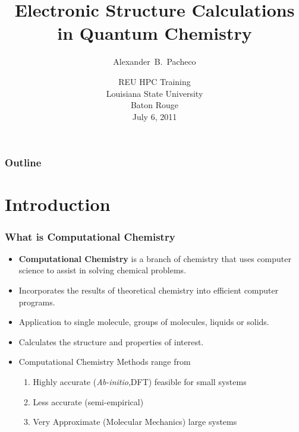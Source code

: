 \documentclass[slidestop,mathserif,compress,xcolor=svgnames]{beamer}
\title[Comp. Chem.]{Electronic Structure Calculations in Quantum Chemistry}
\author[Alex Pacheco]{\large{Alexander~B.~Pacheco}}
\institute[High Performance Computing @ Louisiana State University - http://www.hpc.lsu.edu] {\inst{}\footnotesize{User Services Consultant\\LSU HPC \& LONI\\sys-help@loni.org}}
\date[\hfill{July 6, 2011\hspace{2cm}\insertframenumber/\inserttotalframenumber}]{\scriptsize{REU HPC Training\\Louisiana State University\\Baton Rouge\\July 6, 2011}}
\begin{document}
\frame{\titlepage}

\normalsize
\begin{frame}[label=toc,squeeze]
  \footnotesize
  \frametitle{\small{Outline}}
  \tableofcontents
  \tableofcontents[part=1]
  \tableofcontents[part=2]
  \tableofcontents[part=3]
  \tableofcontents[part=4]
  \tableofcontents[part=5]
\end{frame}

\normalsize

\section{Introduction}
\begin{frame}
\frametitle{\small What is Computational Chemistry}
\begin{itemize}
\item {\bf Computational Chemistry} is a branch of chemistry that uses computer science to assist in solving chemical problems.
\item Incorporates the results of theoretical chemistry into efficient computer programs.
\item Application to single molecule, groups of molecules, liquids or solids.
\item Calculates the structure and properties of interest.
\item Computational Chemistry Methods range from
 \begin{enumerate}
  \item Highly accurate ({\it Ab-initio},DFT) feasible for small systems
  \item Less accurate (semi-empirical)
  \item Very Approximate (Molecular Mechanics) large systems
 \end{enumerate}
\end{itemize}
\end{frame}
\end{document}
